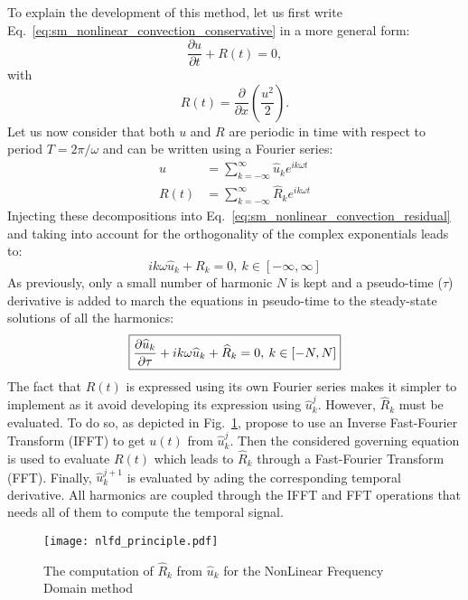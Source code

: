 To explain the development of this method, let us first 
write Eq.~\ref{eq:sm_nonlinear_convection_conservative} 
in a more general form:
\begin{equation}
	\frac{\partial u}{\partial t} + R (t) = 0,
	\label{eq:sm_nonlinear_convection_residual}
\end{equation}
with
\begin{equation}
	R(t) = \frac{\partial}{\partial x} \left( 
	\frac{u^2}{2} \right).
\end{equation}
Let us now consider that both $u$ and $R$ are periodic
in time with respect to period $T = 2 \pi / \omega$
and can be written using a Fourier series:
\begin{equation}
	\begin{split}
		u &= \sum_{k=-\infty}^{\infty} \widehat{u}_k e^{i k \omega t} \\
		R(t) &= \sum_{k=-\infty}^{\infty} \widehat{R}_k e^{i k \omega t}
	\end{split}
\end{equation}
Injecting these decompositions into 
Eq.~\ref{eq:sm_nonlinear_convection_residual} and taking into account
for the orthogonality of the complex exponentials leads to:
\begin{equation}
	i k \omega \widehat{u}_k + R_k = 0, \: k \in [-\infty, \infty]
\end{equation}
As previously, only a small number of harmonic $N$ is kept and 
a pseudo-time ($\tau$) derivative is added to march the equations
in pseudo-time to the steady-state solutions of all the harmonics:
\begin{equation}
	\fbox{$
	\displaystyle \frac{\partial \widehat{u}_k}{\partial \tau} + 
	i k \omega \widehat{u}_k + \widehat{R}_k = 0, \: k \in [-N, N]
	$}
	\label{eq:sm_nlfd_subset_eq}
\end{equation}
The fact that $R(t)$ is expressed using its own Fourier series 
makes it simpler to implement 
as it avoid developing its expression using $\widehat{u}_k^j$.
However, $\widehat{R}_k$ must be evaluated. To do so, as depicted
in Fig.~\ref{fig:nlfd_principle}, \citet{McMullen2001}
propose to use an Inverse Fast-Fourier Transform (IFFT) to get
$u(t)$ from $\widehat{u}_k^j$. Then the considered governing equation
is used to evaluate $R(t)$ which leads to $\widehat{R}_k$
through a Fast-Fourier Transform (FFT). Finally, $\widehat{u}_k^{j+1}$
is evaluated by ading the corresponding temporal derivative. All
harmonics are coupled through the IFFT and FFT operations
that needs all of them to compute the temporal signal.
\begin{figure}[htbp]
  \centering
  \texttt{[image: nlfd\_principle.pdf]}
  \caption{The computation of $\widehat{R}_k$ from $\widehat{u}_k$
  for the NonLinear Frequency Domain method}
  \label{fig:nlfd_principle}
\end{figure}

